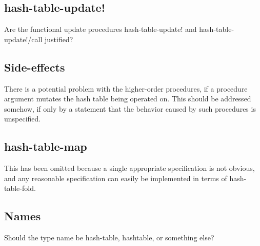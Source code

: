 \documentclass[twoside]{algol60}
\begin{document}
\subsection{hash-table-update!}
Are the functional update procedures {\cf hash-table-update!} and 
{\cf hash-table-update!/call} justified?

\subsection{Side-effects}
There is a potential problem with the higher-order procedures, if a procedure argument mutates the hash table being operated on.  This should be addressed somehow, if only by a statement that the behavior caused by such procedures is unspecified.

\subsection{hash-table-map}
This has been omitted because a single appropriate specification is not obvious, and any reasonable specification can easily be implemented in terms of {\cf hash-table-fold}.

\subsection{Names}
Should the type name be {\cf hash-table}, {\cf hashtable}, or something else?


\end{document}
